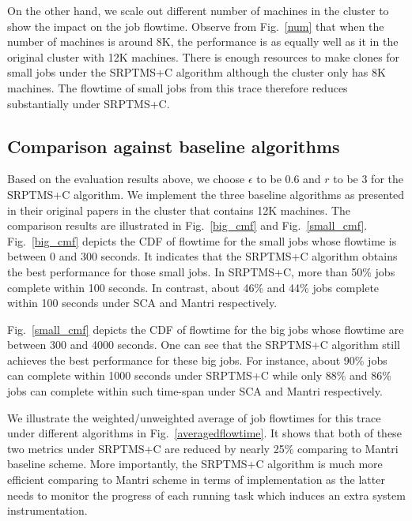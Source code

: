 \documentclass[10pt,conference,compsocconf,letterpaper]{IEEEtran}
\begin{document}
On the other hand, we scale out different number of machines in the cluster to show the impact on the job flowtime. Observe from Fig.~\ref{num}
that when the number of machines is around 8K, the performance is as equally well as  it in the original cluster with 12K machines.  There is  enough resources to
make clones for small jobs under the SRPTMS+C algorithm although the cluster only has 8K machines. The flowtime of small jobs from this trace therefore reduces substantially under SRPTMS+C.



\subsection{Comparison against baseline algorithms}
Based on the evaluation results above, we choose $\epsilon$ to be 0.6 and $r$ to be 3 for the SRPTMS+C algorithm. We implement the three baseline algorithms as presented in their original papers in the cluster that contains 12K machines. The comparison results are illustrated in Fig.~\ref{big_cmf} and Fig.~\ref{small_cmf}. Fig.~\ref{big_cmf} depicts the CDF of  flowtime for the small jobs whose
 flowtime is between 0 and 300 seconds.  It indicates that the SRPTMS+C algorithm obtains the best performance for those small jobs. In SRPTMS+C, more than 50\% jobs complete within 100 seconds. In contrast, about 46\% and 44\% jobs complete within 100 seconds under SCA and Mantri respectively.

Fig.~\ref{small_cmf} depicts the CDF of  flowtime for the big jobs whose
 flowtime are between 300 and 4000 seconds. One can see that the SRPTMS+C algorithm still achieves the best performance for these big jobs. For instance, about 90\% jobs can complete within 1000 seconds under SRPTMS+C while only 88\% and 86\% jobs can complete within such time-span under SCA and Mantri respectively.

We illustrate the weighted/unweighted average of job flowtimes for this trace under different algorithms in Fig.~\ref{averagedflowtime}. It shows that both of these two metrics under SRPTMS+C are reduced by nearly 25\% comparing to Mantri baseline scheme. More importantly, the SRPTMS+C algorithm is much more efficient comparing to Mantri scheme in terms of implementation as the latter needs to monitor the progress of each running task which induces an extra system instrumentation.  
\end{document}
